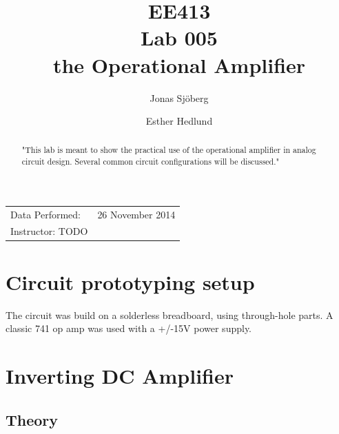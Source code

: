 \documentclass[]{article}
\title{EE413 \\ Lab 005 \\ the Operational Amplifier}
\author{{Jonas Sjöberg} \and {Esther Hedlund}}
\date{}
\begin{document}
\maketitle

\begin{center}
\begin{tabular}{l r}
    Data Performed: & 26 November 2014 \\
    Instructor: TODO
\end{tabular}
\end{center}

\begin{abstract}
"This lab is meant to show the practical use of the operational amplifier in
analog circuit design. Several common circuit configurations will be discussed."
\end{abstract}

\newpage

{
\setcounter{tocdepth}{3}
\tableofcontents
}

\newpage

\section{Circuit prototyping setup}\label{setup}
The circuit was build on a solderless breadboard, using through-hole parts.
A classic 741 op amp was used with a +/-15V power supply.

\section{Inverting DC Amplifier}\label{inverting-dc-amplifier}

\subsection{Theory}\label{theory}
\end{document}
